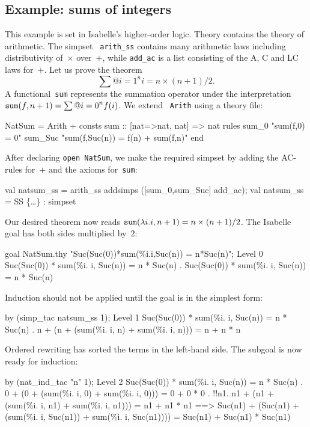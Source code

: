 \subsection{Example: sums of integers}
This example is set in Isabelle's higher-order logic.  Theory
 contains the theory of arithmetic.  The simpset {\tt
  arith_ss} contains many arithmetic laws including distributivity
of~$\times$ over~$+$, while {\tt add_ac} is a list consisting of the A, C
and LC laws for~$+$.  Let us prove the theorem 
\[ \sum@{i=1}^n i = n\times(n+1)/2. \]
%
A functional~{\tt sum} represents the summation operator under the
interpretation ${\tt sum}(f,n+1) = \sum@{i=0}^n f(i)$.  We extend {\tt
  Arith} using a theory file:
\begin{ttbox}
NatSum = Arith +
consts sum     :: [nat=>nat, nat] => nat
rules  sum_0      "sum(f,0) = 0"
       sum_Suc    "sum(f,Suc(n)) = f(n) + sum(f,n)"
end
\end{ttbox}
After declaring {\tt open NatSum}, we make the required simpset by adding
the AC-rules for~$+$ and the axioms for~{\tt sum}:
\begin{ttbox}
val natsum_ss = arith_ss addsimps ([sum_0,sum_Suc] \at add_ac);
{\out val natsum_ss = SS \{\ldots\} : simpset}
\end{ttbox}
Our desired theorem now reads ${\tt sum}(\lambda i.i,n+1) =
n\times(n+1)/2$.  The Isabelle goal has both sides multiplied by~$2$:
\begin{ttbox}
goal NatSum.thy "Suc(Suc(0))*sum(\%i.i,Suc(n)) = n*Suc(n)";
{\out Level 0}
{\out Suc(Suc(0)) * sum(\%i. i, Suc(n)) = n * Suc(n)}
{. Suc(Suc(0)) * sum(\%i. i, Suc(n)) = n * Suc(n)}
\end{ttbox}
Induction should not be applied until the goal is in the simplest form:
\begin{ttbox}
by (simp_tac natsum_ss 1);
{\out Level 1}
{\out Suc(Suc(0)) * sum(\%i. i, Suc(n)) = n * Suc(n)}
{. n + (n + (sum(\%i. i, n) + sum(\%i. i, n))) = n + n * n}
\end{ttbox}
Ordered rewriting has sorted the terms in the left-hand side.
The subgoal is now ready for induction:
\begin{ttbox}
by (nat_ind_tac "n" 1);
{\out Level 2}
{\out Suc(Suc(0)) * sum(\%i. i, Suc(n)) = n * Suc(n)}
{. 0 + (0 + (sum(\%i. i, 0) + sum(\%i. i, 0))) = 0 + 0 * 0}
\ttbreak
{. !!n1. n1 + (n1 + (sum(\%i. i, n1) + sum(\%i. i, n1))) =}
{\out           n1 + n1 * n1 ==>}
{\out           Suc(n1) +}
{\out           (Suc(n1) + (sum(\%i. i, Suc(n1)) + sum(\%i. i, Suc(n1)))) =}
{\out           Suc(n1) + Suc(n1) * Suc(n1)}
\end{ttbox}
